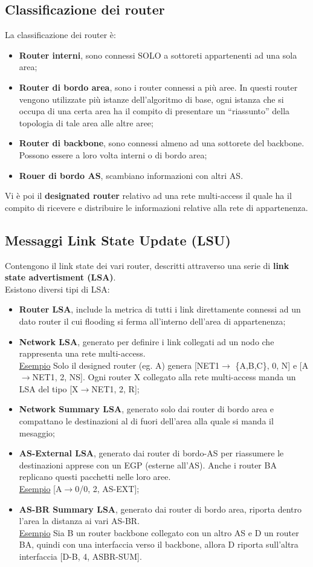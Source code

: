 \documentclass{article}
\begin{document}
\subsection{Classificazione dei router}
La classificazione dei router è:
\begin{itemize}
    \item \textbf{Router interni}, sono connessi SOLO a sottoreti appartenenti ad una sola area;
    \item \textbf{Router di bordo area}, sono i router connessi a più aree. In questi router vengono utilizzate più istanze dell'algoritmo di base, ogni istanza che si occupa di una certa area ha il compito di presentare un “riassunto” della topologia di tale area alle altre aree;
    \item \textbf{Router di backbone}, sono connessi almeno ad una sottorete del backbone. Possono essere a loro volta interni o di bordo area;
    \item \textbf{Rouer di bordo AS}, scambiano informazioni con altri AS.
\end{itemize}
Vi è poi il \textbf{designated router} relativo ad una rete multi-access il quale ha il compito di ricevere e distribuire le informazioni relative alla rete di appartenenza.
\subsection{Messaggi Link State Update (LSU)}
Contengono il link state dei vari router, descritti attraverso una serie di \textbf{link state advertisment (LSA)}.\\
Esistono diversi tipi di LSA:
\begin{itemize}
    \item \textbf{Router LSA}, include la metrica di tutti i link direttamente connessi ad un dato router il cui flooding si ferma all'interno dell'area di appartenenza;
    \item \textbf{Network LSA}, generato per definire i link collegati ad un nodo che rappresenta una rete multi-access.\\ \underline{Esempio} Solo il designed router (eg. A) genera [NET1$\rightarrow$ \{A,B,C\}, 0, N] e [A$\rightarrow$NET1, 2, NS]. Ogni router X collegato alla rete multi-access manda un LSA del tipo [X$\rightarrow$NET1, 2, R];
    \item \textbf{Network Summary LSA}, generato solo dai router di bordo area e compattano le destinazioni al di fuori dell'area alla quale si manda il mesaggio;
    \item \textbf{AS-External LSA}, generato dai router di bordo-AS per riassumere le destinazioni apprese con un EGP (esterne all’AS). Anche i router BA replicano questi pacchetti nelle loro aree.\\
    \underline{Esempio} [A$\rightarrow$0/0, 2, AS-EXT];
    \item \textbf{AS-BR Summary LSA}, generato dai router di bordo area, riporta dentro l’area la distanza ai vari AS-BR.\\
    \underline{Esempio} Sia B un router backbone collegato con un altro AS e D un router BA, quindi con una interfaccia verso il backbone, allora D riporta sull'altra interfaccia [D-B, 4, ASBR-SUM].
\end{itemize}
\end{document}
